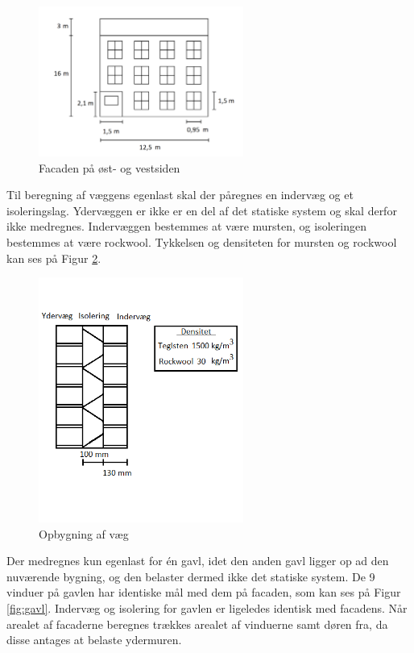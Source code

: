\begin{figure}[H]
	\centering
	\includegraphics[width=0.6\textwidth]{billeder/facadenord.png}
	\caption{Facaden på øst- og vestsiden}
	\label{fig:facade}
\end{figure}

Til beregning af væggens egenlast skal der påregnes en indervæg og et isoleringslag. Ydervæggen er ikke er en del af det statiske system og skal derfor ikke medregnes. Indervæggen bestemmes at være mursten, og isoleringen bestemmes at være rockwool. Tykkelsen og densiteten for mursten og rockwool kan ses på Figur \ref{fig:vaeg}.

\begin{figure}[H]
	\centering
	\includegraphics[width=0.6\textwidth]{billeder/mur.png}
	\caption{Opbygning af væg}
	\label{fig:vaeg}
\end{figure}

Der medregnes kun egenlast for én gavl, idet den anden gavl ligger op ad den nuværende bygning, og den belaster dermed ikke det statiske system. 
\newline \indent{     }  De 9 vinduer på gavlen har identiske mål med dem på facaden, som kan ses på Figur \ref{fig:gavl}. Indervæg og isolering for gavlen er ligeledes identisk med facadens.
\newline \indent{     }  Når arealet af facaderne beregnes trækkes arealet af vinduerne samt døren fra, da disse antages at belaste ydermuren.

